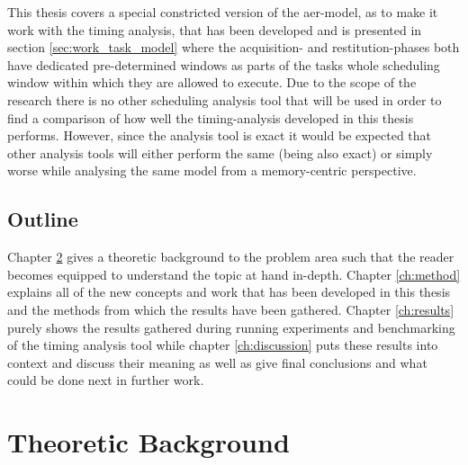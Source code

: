 \documentclass{kththesis}
\begin{document}
This thesis covers a special constricted version of the \acrshort{aer}-model, as to make it work
with the timing analysis, that has been developed and is presented in section
\ref{sec:work_task_model} where the acquisition- and restitution-phases both have dedicated
pre-determined windows as parts of the tasks whole scheduling window within which they are allowed
to execute. Due to the scope of the research there is no other scheduling analysis tool that
will be used in order to find a comparison of how well the timing-analysis developed in this thesis
performs. However, since the analysis tool is exact it would be expected that other analysis tools
will either perform the same (being also exact) or simply worse while analysing the same model from
a memory-centric perspective.


\section{Outline}

Chapter \ref{ch:theoretic_background} gives a theoretic background to the problem area such that the
reader becomes equipped to understand the topic at hand in-depth. Chapter \ref{ch:method} explains
all of the new concepts and work that has been developed in this thesis and the methods from which
the results have been gathered. Chapter \ref{ch:results} purely shows the results gathered during
running experiments and benchmarking of the timing analysis tool while chapter \ref{ch:discussion}
puts these results into context and discuss their meaning as well as give final conclusions and what
could be done next in further work.


\chapter{Theoretic Background}\label{ch:theoretic_background}
\end{document}

